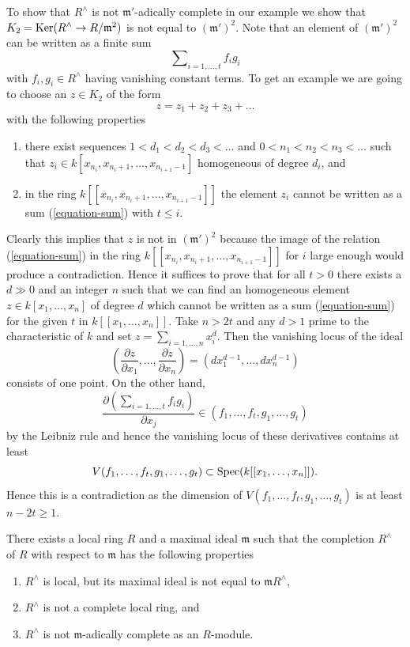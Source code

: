 \medskip\noindent
To show that $R^\wedge$ is not $\mathfrak m'$-adically complete
in our example we show that $K_2 = \mathop{\mathrm{Ker}}(R^\wedge \to R/\mathfrak m^2)$
is not equal to $(\mathfrak m')^2$.
Note that an element of $(\mathfrak m')^2$
can be written as a finite sum
\begin{equation}
\label{equation-sum}
\sum\nolimits_{i = 1, \ldots, t} f_i g_i
\end{equation}
with $f_i, g_i \in R^\wedge$ having vanishing constant terms.
To get an example we are going to choose an $z \in K_2$
of the form
$$
z = z_1 + z_2 + z_3 + \ldots
$$
with the following properties
\begin{enumerate}
\item there exist sequences $1 < d_1 < d_2 < d_3 < \ldots $ and
$0 < n_1 < n_2 < n_3 < \ldots$ such that
$z_i \in k[x_{n_i}, x_{n_i + 1}, \ldots, x_{n_{i + 1} - 1}]$
homogeneous of degree $d_i$, and
\item in the ring $k[[x_{n_i}, x_{n_i + 1}, \ldots, x_{n_{i + 1} - 1}]]$
the element $z_i$ cannot be written as a sum (\ref{equation-sum})
with $t \leq i$.
\end{enumerate}
Clearly this implies that $z$ is not in $(\mathfrak m')^2$
because the image of the relation (\ref{equation-sum}) in the
ring $k[[x_{n_i}, x_{n_i + 1}, \ldots, x_{n_{i + 1} - 1}]]$
for $i$ large enough would produce a contradiction. Hence it suffices
to prove that for all $t > 0$ there exists a $d \gg 0$ and an integer
$n$ such that we can find an homogeneous element
$z \in k[x_1, \ldots, x_n]$ of degree $d$ which cannot be written as
a sum (\ref{equation-sum}) for the given $t$ in $k[[x_1, \ldots, x_n]]$.
Take $n > 2t$ and any $d > 1$ prime to the characteristic of $k$ and
set $z = \sum_{i = 1, \ldots, n} x_i^d$. Then the vanishing locus
of the ideal
$$
(\frac{\partial z}{\partial x_1}, \ldots, \frac{\partial z}{\partial x_n})
=
(dx_1^{d - 1}, \ldots, dx_n^{d - 1})
$$
consists of one point. On the other hand,
$$
\frac{\partial ( \sum\nolimits_{i = 1, \ldots, t} f_i g_i ) }{\partial x_j}
\in (f_1, \ldots, f_t, g_1, \ldots, g_t)
$$
by the Leibniz rule and hence the vanishing locus of these derivatives
contains at least
$$
V(f_1, \ldots, f_t, g_1, \ldots, g_t) \subset
\mathop{\mathrm{Spec}}(k[[x_1, \ldots, x_n]]).
$$
Hence this is a contradiction as the dimension of
$V(f_1, \ldots, f_t, g_1, \ldots, g_t)$ is at least $n - 2t \geq 1$.

\begin{lemma}
\label{lemma-noncomplete-completion}
There exists a local ring $R$ and a maximal ideal $\mathfrak m$ such that
the completion $R^\wedge$ of $R$ with respect to $\mathfrak m$ has the
following properties
\begin{enumerate}
\item $R^\wedge$ is local, but its maximal ideal is not equal to
$\mathfrak m R^\wedge$,
\item $R^\wedge$ is not a complete local ring, and
\item $R^\wedge$ is not $\mathfrak m$-adically complete as an $R$-module.
\end{enumerate}
\end{lemma}


